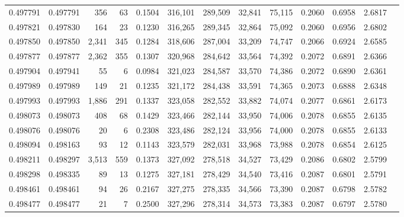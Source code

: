 \begin{tabular}{rrrrrrrrrrrrr}
0.497791 & 0.497791 &   356 &    63 &                                     0.1504 & 316,101 & 289,509 &  32,841 &  75,115 & 0.2060 & 0.6958 & 2.6817 \\
0.497821 & 0.497830 &   164 &    23 &                                     0.1230 & 316,265 & 289,345 &  32,864 &  75,092 & 0.2060 & 0.6956 & 2.6802 \\
0.497850 & 0.497850 & 2,341 &   345 &                                     0.1284 & 318,606 & 287,004 &  33,209 &  74,747 & 0.2066 & 0.6924 & 2.6585 \\
0.497877 & 0.497877 & 2,362 &   355 &                                     0.1307 & 320,968 & 284,642 &  33,564 &  74,392 & 0.2072 & 0.6891 & 2.6366 \\
0.497904 & 0.497941 &    55 &     6 &                                     0.0984 & 321,023 & 284,587 &  33,570 &  74,386 & 0.2072 & 0.6890 & 2.6361 \\
0.497989 & 0.497989 &   149 &    21 &                                     0.1235 & 321,172 & 284,438 &  33,591 &  74,365 & 0.2073 & 0.6888 & 2.6348 \\
0.497993 & 0.497993 & 1,886 &   291 &                                     0.1337 & 323,058 & 282,552 &  33,882 &  74,074 & 0.2077 & 0.6861 & 2.6173 \\
0.498073 & 0.498073 &   408 &    68 &                                     0.1429 & 323,466 & 282,144 &  33,950 &  74,006 & 0.2078 & 0.6855 & 2.6135 \\
0.498076 & 0.498076 &    20 &     6 &                                     0.2308 & 323,486 & 282,124 &  33,956 &  74,000 & 0.2078 & 0.6855 & 2.6133 \\
0.498094 & 0.498163 &    93 &    12 &                                     0.1143 & 323,579 & 282,031 &  33,968 &  73,988 & 0.2078 & 0.6854 & 2.6125 \\
0.498211 & 0.498297 & 3,513 &   559 &                                     0.1373 & 327,092 & 278,518 &  34,527 &  73,429 & 0.2086 & 0.6802 & 2.5799 \\
0.498298 & 0.498335 &    89 &    13 &                                     0.1275 & 327,181 & 278,429 &  34,540 &  73,416 & 0.2087 & 0.6801 & 2.5791 \\
0.498461 & 0.498461 &    94 &    26 &                                     0.2167 & 327,275 & 278,335 &  34,566 &  73,390 & 0.2087 & 0.6798 & 2.5782 \\
0.498477 & 0.498477 &    21 &     7 &                                     0.2500 & 327,296 & 278,314 &  34,573 &  73,383 & 0.2087 & 0.6797 & 2.5780 \\

\end{tabular}
